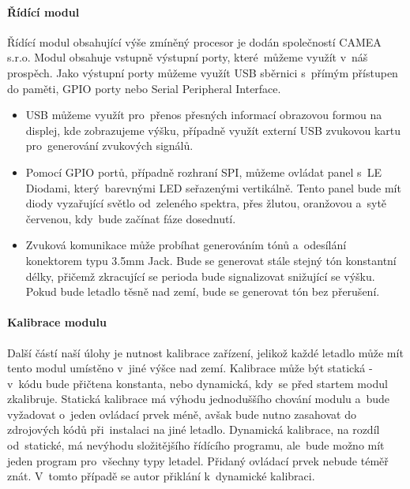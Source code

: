 			\paragraph{Řídící modul}
				Řídící modul obsahující výše zmíněný procesor je dodán společností CAMEA s.r.o. Modul obsahuje vstupně výstupní porty, které~můžeme využít v~náš prospěch. Jako výstupní porty můžeme využít USB sběrnici s~přímým přístupen do paměti, GPIO porty nebo Serial Peripheral Interface. 
				\begin{itemize}
					\item USB můžeme využít pro~přenos přesných informací obrazovou formou na displej, kde zobrazujeme výšku, případně využít externí USB zvukovou kartu pro~generování zvukových signálů. 
					
					\item Pomocí GPIO portů, případně rozhraní SPI, můžeme ovládat panel s~LE Diodami, který~barevnými LED seřazenými vertikálně. Tento panel bude mít diody vyzařující světlo od~zeleného spektra, přes žlutou, oranžovou a~sytě červenou, kdy~bude začínat fáze dosednutí.
					
					\item Zvuková komunikace může probíhat generováním tónů a~odesílání konektorem typu 3.5mm Jack. Bude se generovat stále stejný tón konstantní délky, přičemž zkracující se perioda bude signalizovat snižující se výšku. Pokud bude letadlo těsně nad zemí, bude se generovat tón bez přerušení.
				\end{itemize}
			
			\paragraph{Kalibrace modulu}
				Další částí naší úlohy je nutnost kalibrace zařízení, jelikož každé letadlo může mít tento modul umístěno v~jiné výšce nad zemí. Kalibrace může být statická - v~kódu bude přičtena konstanta, nebo dynamická, kdy~se před startem modul zkalibruje. Statická kalibrace má výhodu jednoduššího chování modulu a~bude vyžadovat o~jeden ovládací prvek méně, avšak bude nutno zasahovat do zdrojových kódů při~instalaci na jiné letadlo. Dynamická kalibrace, na rozdíl od~statické, má nevýhodu složitějšího řídícího programu, ale~bude možno mít jeden program pro~všechny typy letadel. Přidaný ovládací prvek nebude téměř znát. V~tomto případě se autor přiklání k~dynamické kalibraci.
				
